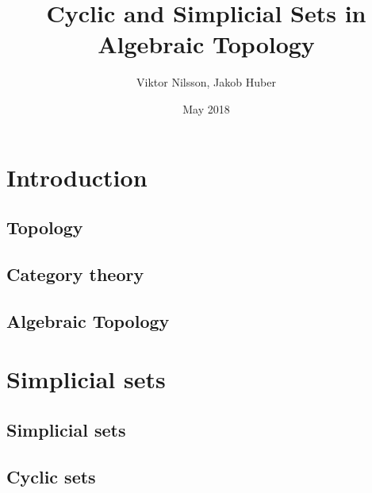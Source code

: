 \documentclass{report}
\title{Cyclic and Simplicial Sets in Algebraic Topology}
\author{Viktor Nilsson, Jakob Huber}
\date{May 2018}
\theoremstyle{definition}
\begin{document}
    \maketitle
    
    \begin{abstract}
        
    \end{abstract}
    
    \tableofcontents
    
    \chapter{Introduction}
        
        
        \section{Topology}
            
        \section{Category theory}
            
        \section{Algebraic Topology}
            
    
    \chapter{Simplicial sets}
    
        \section{Simplicial sets}
            
        \section{Cyclic sets}
            
    
    \printbibliography
\end{document}
